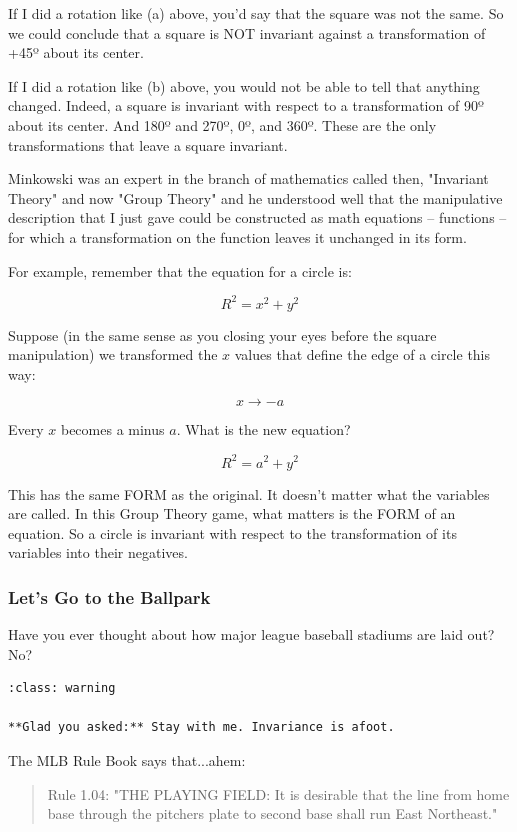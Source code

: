 \documentclass[
]{article}
\begin{document}
If I did a rotation like (a) above, you'd say that the square was not
the same. So we could conclude that a square is NOT invariant against a
transformation of +45º about its center.

If I did a rotation like (b) above, you would not be able to tell that
anything changed. Indeed, a square is invariant with respect to a
transformation of 90º about its center. And 180º and 270º, 0º, and 360º.
These are the only transformations that leave a square invariant.

Minkowski was an expert in the branch of mathematics called then,
"Invariant Theory" and now "Group Theory" and he understood well that
the manipulative description that I just gave could be constructed as
math equations -- functions -- for which a transformation on the
function leaves it unchanged in its form.

For example, remember that the equation for a circle is:

\[R^2 = x^2 + y^2 \nonumber\]

Suppose (in the same sense as you closing your eyes before the square
manipulation) we transformed the \(x\) values that define the edge of a
circle this way:

\[x \to -a \nonumber\]

Every \(x\) becomes a minus \(a\). What is the new equation?

\[R^2 = a^2 + y^2 \nonumber\]

This has the same FORM as the original. It doesn't matter what the
variables are called. In this Group Theory game, what matters is the
FORM of an equation. So a circle is invariant with respect to the
transformation of its variables into their negatives.

\hypertarget{lets-go-to-the-ballpark}{%
\subsubsection{Let's Go to the Ballpark}\label{lets-go-to-the-ballpark}}

Have you ever thought about how major league baseball stadiums are laid
out? No?

\begin{verbatim}
:class: warning

**Glad you asked:** Stay with me. Invariance is afoot.
\end{verbatim}

The MLB Rule Book says that...ahem:

\begin{quote}
Rule 1.04: "THE PLAYING FIELD: It is desirable that the line from home
base through the pitchers plate to second base shall run East
Northeast."
\end{quote}
\end{document}
